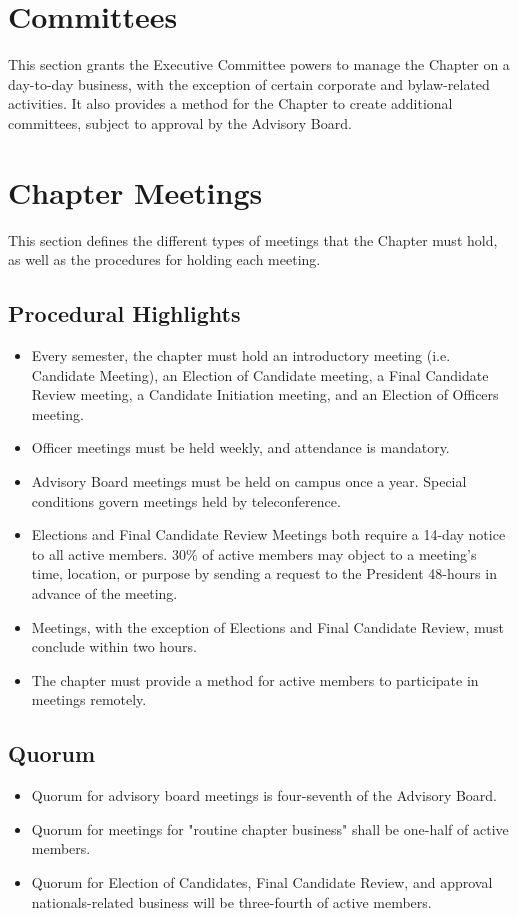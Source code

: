 \documentclass{article}
\begin{document}
	\section{Committees}
	This section grants the Executive Committee powers to manage the Chapter on a day-to-day business, with the exception of certain corporate and bylaw-related activities. It also provides a method for the Chapter to create additional committees, subject to approval by the Advisory Board.
	
	\section{Chapter Meetings}
	This section defines the different types of meetings that the Chapter must hold, as well as the procedures for holding each meeting.
	
	\subsection{Procedural Highlights}
	\begin{itemize}
		\item Every semester, the chapter must hold an introductory meeting (i.e. Candidate Meeting), an Election of Candidate meeting, a Final Candidate Review meeting, a Candidate Initiation meeting, and an Election of Officers meeting.
		\item Officer meetings must be held weekly, and attendance is mandatory.
		\item Advisory Board meetings must be held on campus once a year. Special conditions govern meetings held by teleconference.
		\item Elections and Final Candidate Review Meetings both require a 14-day notice to all active members. 30\% of active members may object to a meeting's time, location, or purpose by sending a request to the President 48-hours in advance of the meeting.
		\item Meetings, with the exception of Elections and Final Candidate Review, must conclude within two hours.
		\item The chapter must provide a method for active members to participate in meetings remotely.
	\end{itemize}
	\subsection{Quorum}
	\begin{itemize}
		\item Quorum for advisory board meetings is four-seventh of the Advisory Board.
		\item Quorum for meetings for "routine chapter business" shall be one-half of active members.
		\item Quorum for Election of Candidates, Final Candidate Review, and approval nationals-related business will be three-fourth of active members.
	\end{itemize}
	
\end{document}
